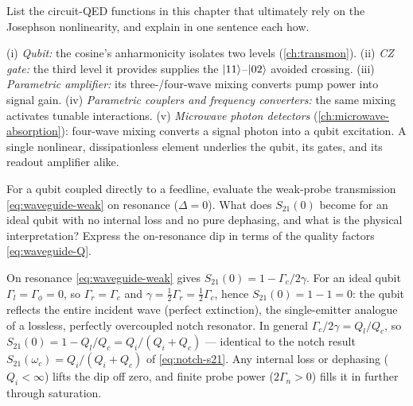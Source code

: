 \begin{exercise}
List the circuit-QED functions in this chapter that ultimately rely on
the Josephson nonlinearity, and explain in one sentence each how.
\begin{solution}
(i) \emph{Qubit:} the cosine's anharmonicity isolates two levels
(\cref{ch:transmon}). (ii) \emph{CZ gate:} the third level it provides
supplies the $\ket{11}$--$\ket{02}$ avoided crossing. (iii)
\emph{Parametric amplifier:} its three-/four-wave mixing converts pump
power into signal gain. (iv) \emph{Parametric couplers and frequency
converters:} the same mixing activates tunable interactions. (v)
\emph{Microwave photon detectors} (\cref{ch:microwave-absorption}):
four-wave mixing converts a signal photon into a qubit excitation. A
single nonlinear, dissipationless element underlies the qubit, its
gates, and its readout amplifier alike.
\end{solution}
\end{exercise}

\begin{exercise}
For a qubit coupled directly to a feedline, evaluate the weak-probe
transmission \cref{eq:waveguide-weak} on resonance ($\Delta=0$). What
does $S_{21}(0)$ become for an ideal qubit with no internal loss and no
pure dephasing, and what is the physical interpretation? Express the
on-resonance dip in terms of the quality factors \cref{eq:waveguide-Q}.
\begin{solution}
On resonance \cref{eq:waveguide-weak} gives
$S_{21}(0)=1-\Gamma_c/2\gamma$. For an ideal qubit
$\Gamma_l=\Gamma_\phi=0$, so $\Gamma_r=\Gamma_c$ and
$\gamma=\tfrac12\Gamma_r=\tfrac12\Gamma_c$, hence $S_{21}(0)=1-1=0$:
the qubit reflects the entire incident wave (perfect extinction), the
single-emitter analogue of a lossless, perfectly overcoupled notch
resonator. In general $\Gamma_c/2\gamma=Q_l/Q_c$, so
$S_{21}(0)=1-Q_l/Q_c=Q_i/(Q_i+Q_c)$ --- identical to the notch result
$S_{21}(\omega_c)=Q_i/(Q_i+Q_c)$ of \cref{eq:notch-s21}. Any internal
loss or dephasing ($Q_i<\infty$) lifts the dip off zero, and finite
probe power ($2\Gamma_n>0$) fills it in further through saturation.
\end{solution}
\end{exercise}
